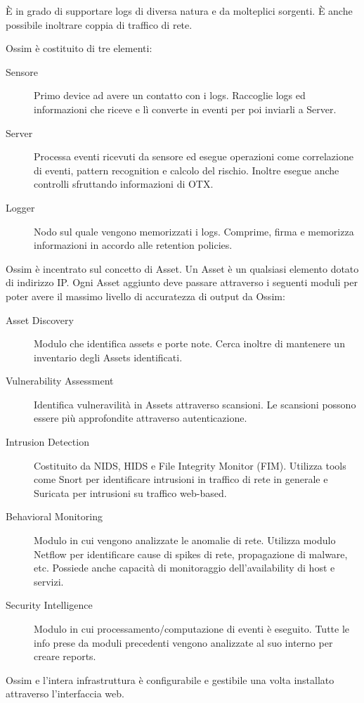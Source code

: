 È in grado di supportare logs di diversa natura e da molteplici sorgenti. È anche possibile inoltrare coppia di traffico di rete.

Ossim è costituito di tre elementi:
\begin{description}
    \item [Sensore] Primo device ad avere un contatto con i logs. Raccoglie logs ed informazioni che riceve e lì converte in eventi per poi inviarli a Server.
    \item [Server] Processa eventi ricevuti da sensore ed esegue operazioni come correlazione di eventi, pattern recognition e calcolo del rischio. Inoltre esegue anche controlli sfruttando informazioni di OTX.
    \item [Logger] Nodo sul quale vengono memorizzati i logs. Comprime, firma e memorizza informazioni in accordo alle retention policies.
\end{description}

Ossim è incentrato sul concetto di Asset. Un Asset è un qualsiasi elemento dotato di indirizzo IP.
Ogni Asset aggiunto deve passare attraverso i seguenti moduli per poter avere il massimo livello di accuratezza di output da Ossim:
\begin{description}
    \item [Asset Discovery] Modulo che identifica assets e porte note. Cerca inoltre di mantenere un inventario degli Assets identificati.
    \item [Vulnerability Assessment] Identifica vulneravilità in Assets attraverso scansioni. Le scansioni possono essere più approfondite attraverso autenticazione.
    \item [Intrusion Detection] Costituito da NIDS, HIDS e File Integrity Monitor (FIM). Utilizza tools come Snort per identificare intrusioni in  traffico di rete in generale e Suricata per intrusioni su traffico web-based. 
    \item [Behavioral Monitoring] Modulo in cui vengono analizzate le anomalie di rete. Utilizza modulo Netflow per identificare cause di spikes di rete, propagazione di malware, etc.
    Possiede anche capacità di monitoraggio dell'availability di host e servizi.
    \item [Security Intelligence] Modulo in cui processamento/computazione di eventi è eseguito. Tutte le info prese da moduli precedenti vengono analizzate al suo interno per creare reports. 
\end{description}

Ossim e l'intera infrastruttura è configurabile e gestibile una volta installato attraverso l'interfaccia web.


